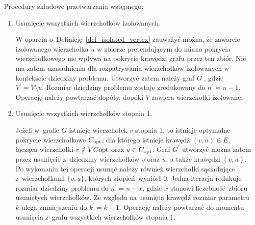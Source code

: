 Procedury składowe przetwarzania wstępnego:
\begin{enumerate}
  \item Usunięcie wszystkich wierzchołków izolowanych.

    W oparciu o~Definicję~\ref{def_isolated_vertex} zauważyć można, że zawarcie
    izolowanego wierzchołka $u$ w zbiorze pretendującym do miana pokrycia
    wierzchołkowego nie wpływa na pokrycie krawędzi grafu przez ten zbiór.
    Nie ma zatem uzasadnienia dla rozpatrywania wierzchołków izolowanych w
    kontekście dziedziny problemu.
    Utworzyć zatem należy graf $G^\prime$, gdzie $V^\prime = V \setminus u$.
    Rozmiar dziedziny problemu zostaje zredukowany do $n^\prime=n-1$.
    Operację należy powtarzać dopóty, dopóki $V$ zawiera wierzchołki izolowane.

  \item Usunięcie wszystkich wierzchołków stopnia 1.

    Jeżeli w~grafie $G$ istnieje wierzchołek $v$ stopnia 1, to istnieje optymalne pokrycie wierzchołkowe $C_{\textnormal{opt}}$, dla którego istnieje krawędź $(v,u) \in E$, łącząca wierzchołki $v \notin VC{\textnormal{opt}}$ oraz $u \in C_{\textnormal{opt}}$.
    Graf $G^\prime$ utworzyć można zatem przez usunięcie z~dziedziny wierzchołków $v$ oraz
    $u$, a także krawędzi $(v,u)$.
    Po wykonaniu tej operacji usunąć należy również wierzchołki sąsiadujące z~wierzchołkami
    $\{v,u\}$, których stopień~wyniósł 0.
    Jedna iteracja redukuje rozmiar dziedziny problemu do $n^\prime=n-x$, gdzie
    $x$ stanowi liczebność~zbioru usuniętych wierzchołków.
    Ze względu na usuniętą krawędź rozmiar parametru $k$ ulega zmniejszeniu do
    $k^\prime=k-1$.
    Operację należy powtarzać do momentu usunięcia z~grafu wszystkich
    wierzchołków stopnia 1.


\end{enumerate}
